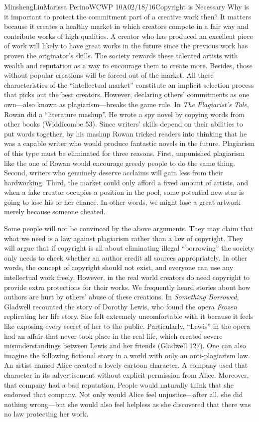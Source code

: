 \documentclass[12pt,letterpaper]{article}
\begin{document}
\begin{mla}{Minsheng}{Liu}{Marissa Perino}{WCWP 10A}{02/18/16}{Copyright is Necessary}
Why is it important to protect the commitment part of a creative work
then? It matters because it creates a healthy market in which creators
compete in a fair way and contribute works of high qualities. A creator
who has produced an excellent piece of work will likely to have great
works in the future since the previous work has proven the originator's
skills. The society rewards these talented artists with wealth and
reputation as a way to encourage them to create more. Besides, those
without popular creations will be forced out of the market. All these
characteristics of the ``intellectual market'' constitute an implicit
selection process that picks out the best creators. However, declaring
others' commitments as one own---also known as plagiarism---breaks the
game rule. In \emph{The Plagiarist's Tale}, Rowan did a ``literature
mashup''. He wrote a spy novel by copying words from other books
(Widdicombe 53). Since writers' skills depend on their abilities to put
words together, by his mashup Rowan tricked readers into thinking that
he was a capable writer who would produce fantastic novels in the
future. Plagiarism of this type must be eliminated for three reasons.
First, unpunished plagiarism like the one of Rowan would encourage
greedy people to do the same thing. Second, writers who genuinely
deserve acclaims will gain less from their hardworking. Third, the
market could only afford a fixed amount of artists, and when a fake
creator occupies a position in the pool, some potential new star is
going to lose his or her chance. In other words, we might lose a great
artwork merely because someone cheated.

Some people will not be convinced by the above arguments. They may claim
that what we need is a law against plagiarism rather than a law of
copyright. They will argue that if copyright is all about eliminating
illegal ``borrowing'' the society only needs to check whether an author
credit all sources appropriately. In other words, the concept of
copyright should not exist, and everyone can use any intellectual work
freely. However, in the real world creators do need copyright to provide
extra protections for their works. We frequently heard stories about how
authors are hurt by others' abuse of these creations. In \emph{Something
Borrowed}, Gladwell recounted the story of Dorothy Lewis, who found the
opera \emph{Frozen} replicating her life story. She felt extremely
uncomfortable with it because it feels like exposing every secret of her
to the public. Particularly, ``Lewis'' in the opera had an affair that
never took place in the real life, which created severe
misunderstandings between Lewis and her friends (Gladwell 127). One can
also imagine the following fictional story in a world with only an
anti-plagiarism law. An artist named Alice created a lovely cartoon
character. A company used that character in its advertisement without
explicit permission from Alice. Moreover, that company had a bad
reputation. People would naturally think that she endorsed that company.
Not only would Alice feel unjustice---after all, she did nothing
wrong---but she would also feel helpless as she discovered that there
was no law protecting her work.


\end{mla}
\end{document}
